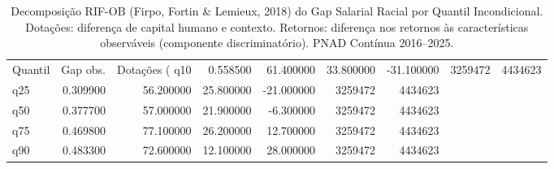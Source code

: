 \begin{table}
\caption{Decomposição RIF-OB (Firpo, Fortin \& Lemieux, 2018) do Gap Salarial Racial por Quantil Incondicional. Dotações: diferença de capital humano e contexto. Retornos: diferença nos retornos às características observáveis (componente discriminatório). PNAD Contínua 2016--2025.}
\label{tab:rif_ob}
\begin{tabular}{lrrrrrr}
\toprule
Quantil & Gap obs. & Dotações (%
\midrule
q10 & 0.558500 & 61.400000 & 33.800000 & -31.100000 & 3259472 & 4434623 \\
q25 & 0.309900 & 56.200000 & 25.800000 & -21.000000 & 3259472 & 4434623 \\
q50 & 0.377700 & 57.000000 & 21.900000 & -6.300000 & 3259472 & 4434623 \\
q75 & 0.469800 & 77.100000 & 26.200000 & 12.700000 & 3259472 & 4434623 \\
q90 & 0.483300 & 72.600000 & 12.100000 & 28.000000 & 3259472 & 4434623 \\
\bottomrule
\end{tabular}
\end{table}
